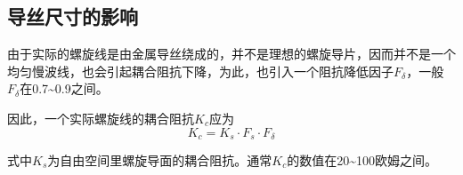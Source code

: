 \subsection{导丝尺寸的影响}
由于实际的螺旋线是由金属导丝绕成的，并不是理想的螺旋导片，因而并不是一个均匀慢波线，也会引起耦合阻抗下降，为此，也引入一个阻抗降低因子$ F_\delta $，一般$ F_\delta $在0.7\textasciitilde0.9之间。

因此，一个实际螺旋线的耦合阻抗$ K_c $应为
\begin{equation} \label{eq:3-28}
	K_c = K_s \cdot F_s \cdot F_\delta
\end{equation}

式中$ K_s $为自由空间里螺旋导面的耦合阻抗。通常$ K_c $的数值在20\textasciitilde100欧姆之间。















